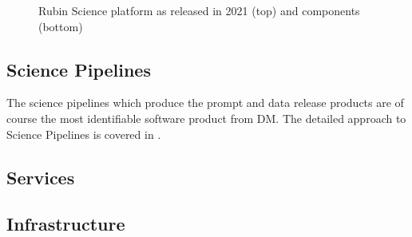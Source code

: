 \begin{figure}
\caption{Rubin Science platform as released in 2021 (top) and components (bottom) \label{fig:sciplat}}
\end{figure}

\subsection{Science Pipelines}\label{sec:pipes}
The science pipelines which produce the prompt and data release products are of course the most identifiable
software product from DM.
The detailed approach to Science Pipelines is covered in \citet{PSTN-019}.



\subsection{Services}

\subsection{Infrastructure}
